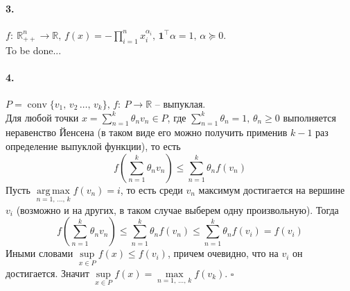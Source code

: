 \documentclass{article}
\DeclareMathOperator{\conv}{conv}
\DeclareMathOperator*{\argmax}{arg\,max}
\newcommand*{\QED}{\null\nobreak\hfill\ensuremath{\square}}%
\newcommand*{\R}{\mathbb{R}}
\begin{document}
\paragraph{3.} $ f:\: \R_{++}^n \to \R,\, f(x) = - \prod\limits_{i = 1}^n x_i^{\alpha_i},\, \mathbf{1}^\top \alpha = 1,\, \alpha \succeq 0 $. \\
To be done...


\paragraph{4.} $ P = \conv\{ v_1,\, v_2\, \dotsc,\, v_k \},\, f :\: P \to \R$ -- выпуклая. \\
Для любой точки $ x = \sum\limits_{n = 1}^k \theta_n v_n \in P$, где $\sum\limits_{n = 1}^k \theta_n = 1,\, \theta_n \geqslant 0$ выполняется неравенство Йенсена (в таком виде его можно получить применив $k - 1$ раз определение выпуклой функции), то есть
\[ f\left( \sum_{n = 1}^k \theta_n v_n \right) \leqslant \sum_{n = 1}^k \theta_n f(v_n) \]
Пусть $\argmax\limits_{n = 1,\,\dotsc,\,k} f(v_n) = i$, то есть среди $v_n$ максимум достигается на вершине $v_i$ (возможно и на других, в таком случае выберем одну произвольную). Тогда 
\[ f\left( \sum_{n = 1}^k \theta_n v_n \right) \leqslant \sum_{n = 1}^k \theta_n f(v_n) \leqslant \sum_{n = 1}^k \theta_n f(v_i) = f(v_i) \]
Иными словами $ \sup\limits_{x \in P} f(x) \leqslant f(v_i) $, причем очевидно, что на $v_i$ он достигается. Значит $ \sup\limits_{x \in P} f(x) = \max\limits_{n = 1,\,\dotsc,\,k} f(v_k) $. \QED 
\end{document}
